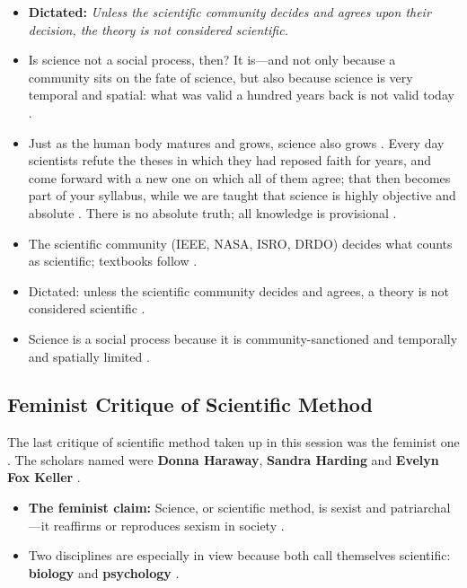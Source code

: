 \begin{KeyConcept}
\begin{itemize}
    \item \textbf{Dictated:} \textit{Unless the scientific community decides and agrees upon their decision, the theory is not considered scientific.} 
    \item Is science not a social process, then? It is---and not only because a community sits on the fate of science, but also because science is very temporal and spatial: what was valid a hundred years back is not valid today .
    \item Just as the human body matures and grows, science also grows . Every day scientists refute the theses in which they had reposed faith for years, and come forward with a new one on which all of them agree; that then becomes part of your syllabus, while we are taught that science is highly objective and absolute . There is no absolute truth; all knowledge is provisional .
\end{itemize}
\end{KeyConcept}

\begin{QuickRevision}
\begin{itemize}
    \item The scientific community (IEEE, NASA, ISRO, DRDO) decides what counts as scientific; textbooks follow .
    \item Dictated: unless the scientific community decides and agrees, a theory is not considered scientific .
    \item Science is a social process because it is community-sanctioned and temporally and spatially limited .
\end{itemize}
\end{QuickRevision}

\subsection{Feminist Critique of Scientific Method}
The last critique of scientific method taken up in this session was the feminist one . The scholars named were \textbf{Donna Haraway}, \textbf{Sandra Harding} and \textbf{Evelyn Fox Keller} .

\begin{KeyConcept}
\begin{itemize}
    \item \textbf{The feminist claim:} Science, or scientific method, is sexist and patriarchal---it reaffirms or reproduces sexism in society .
    \item Two disciplines are especially in view because both call themselves scientific: \textbf{biology} and \textbf{psychology} .
\end{itemize}
\end{KeyConcept}

